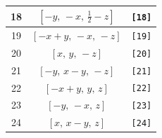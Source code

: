 \documentclass[fleqn,8pt]{jsarticle}
\begin{document}
\begin{longtable}{ccc}
18 & $\left[ - y,\, - x,\, \frac{1}{2} - z \right]$ & {\tt [18]} \\ \hline
19 & $\left[ - x + y,\, - x,\, - z \right]$ & {\tt [19]} \\ \hline
20 & $\left[ x,\, y,\, - z \right]$ & {\tt [20]} \\ \hline
21 & $\left[ - y,\, x - y,\, - z \right]$ & {\tt [21]} \\ \hline
22 & $\left[ - x + y,\, y,\, z \right]$ & {\tt [22]} \\ \hline
23 & $\left[ - y,\, - x,\, z \right]$ & {\tt [23]} \\ \hline
24 & $\left[ x,\, x - y,\, z \right]$ & {\tt [24]} \\
\end{longtable}
\end{document}

